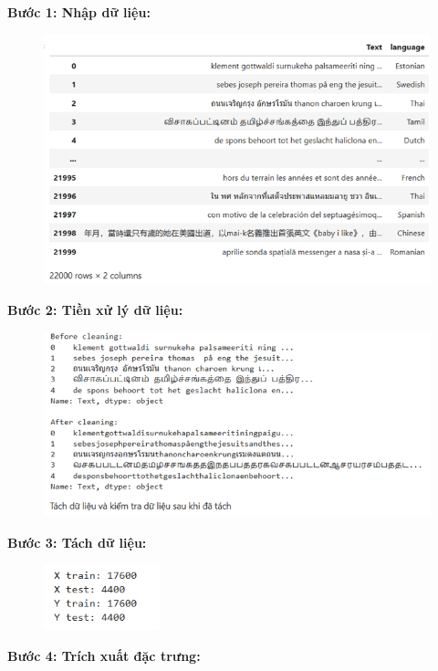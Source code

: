 \textbf{Bước 1: Nhập dữ liệu:}
\begin{figure}[H]
    \centering
    \includegraphics[width=1\textwidth]{img/docspics/Picture2.png}
\end{figure}
\textbf{Bước 2: Tiền xử lý dữ liệu:}
\begin{figure}[H]
    \centering
    \includegraphics[width=1\textwidth]{img/docspics/Picture3.png}
\end{figure}
\clearpage
\textbf{Bước 3: Tách dữ liệu:}
\begin{figure}[H]
    \centering
    \includegraphics[width=0.3\textwidth]{img/docspics/Picture4.png}
\end{figure}
\textbf{Bước 4: Trích xuất đặc trưng:}
